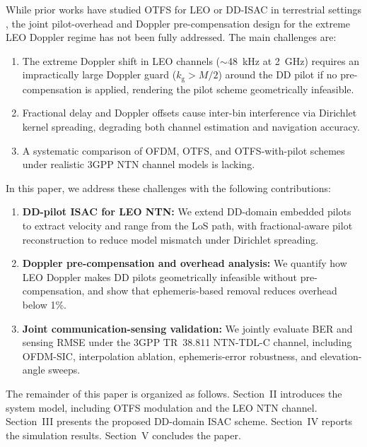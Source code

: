 ﻿\documentclass[conference]{IEEEtran}
\begin{document}
While prior works have studied OTFS for LEO \cite{otfs_leo_2023, otfs_leo_jsac2025} or DD-ISAC in terrestrial settings \cite{dd_isac_2024, gaudio2020otfs_radar}, the joint pilot-overhead and Doppler pre-compensation design for the extreme LEO Doppler regime has not been fully addressed. The main challenges are:
\begin{enumerate}
  \renewcommand{\labelenumi}{\arabic{enumi})}
  \item The extreme Doppler shift in LEO channels ($\sim$48~kHz at 2~GHz) requires an impractically large Doppler guard ($k_{\mathrm{g}} > M/2$) around the DD pilot if no pre-compensation is applied, rendering the pilot scheme geometrically infeasible.
  \item Fractional delay and Doppler offsets cause inter-bin interference via Dirichlet kernel spreading, degrading both channel estimation and navigation accuracy.
  \item A systematic comparison of OFDM, OTFS, and OTFS-with-pilot schemes under realistic 3GPP NTN channel models is lacking.
\end{enumerate}

In this paper, we address these challenges with the following contributions:
\begin{enumerate}
  \renewcommand{\labelenumi}{\arabic{enumi})}
  \item \textbf{DD-pilot ISAC for LEO NTN:} We extend DD-domain embedded pilots to extract velocity and range from the LoS path, with fractional-aware pilot reconstruction to reduce model mismatch under Dirichlet spreading.
  \item \textbf{Doppler pre-compensation and overhead analysis:} We quantify how LEO Doppler makes DD pilots geometrically infeasible without pre-compensation, and show that ephemeris-based removal reduces overhead below 1\%.
  \item \textbf{Joint communication-sensing validation:} We jointly evaluate BER and sensing RMSE under the 3GPP TR~38.811 NTN-TDL-C channel, including OFDM-SIC, interpolation ablation, ephemeris-error robustness, and elevation-angle sweeps.
\end{enumerate}

The remainder of this paper is organized as follows. Section~II introduces the system model, including OTFS modulation and the LEO NTN channel. Section~III presents the proposed DD-domain ISAC scheme. Section~IV reports the simulation results. Section~V concludes the paper.

\end{document}

